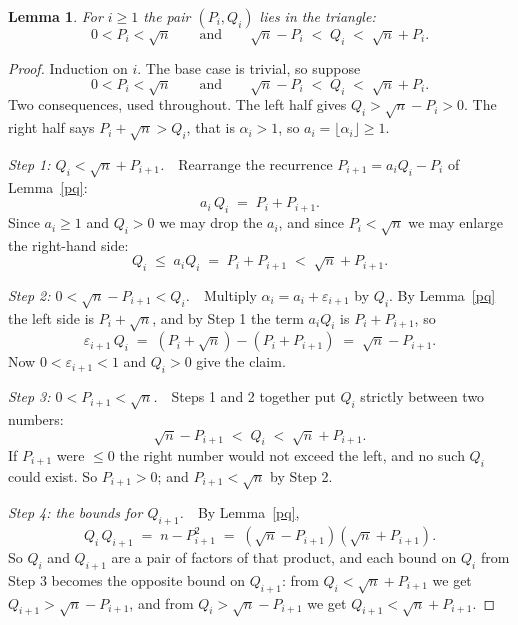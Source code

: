 \documentclass[12pt,a4paper]{article}
\theoremstyle{plain}
\newtheorem{lemma}[theorem]{Lemma}
\theoremstyle{definition}
\begin{document}
\begin{center}
\colorbox{black!8}{%
\begin{minipage}{0.93\textwidth}
\begin{lemma}\label{finite}
For $i \geq 1$ the pair $(P_i, Q_i)$ lies in the triangle:
\[
  0 < P_i < \sqrt n
  \qquad\text{and}\qquad
  \sqrt n - P_i \;<\; Q_i \;<\; \sqrt n + P_i .
\]
\end{lemma}
\end{minipage}}
\end{center}

\begin{proof}
Induction on $i$. The base case is trivial, so suppose
\[
  0 < P_i < \sqrt n
  \qquad\text{and}\qquad
  \sqrt n - P_i \;<\; Q_i \;<\; \sqrt n + P_i .
\]
Two consequences, used throughout. The left half gives
$Q_i > \sqrt n - P_i > 0$. The right half says $P_i + \sqrt n > Q_i$, that is
$\alpha_i > 1$, so $a_i = \lfloor \alpha_i \rfloor \geq 1$.

\smallskip
\noindent\emph{Step 1: $Q_i < \sqrt n + P_{i+1}$.}\ \ Rearrange the recurrence
$P_{i+1} = a_iQ_i - P_i$ of Lemma~\ref{pq}:
\[
  a_i\,Q_i \;=\; P_i + P_{i+1} .
\]
Since $a_i \geq 1$ and $Q_i > 0$ we may drop the $a_i$, and since
$P_i < \sqrt n$ we may enlarge the right-hand side:
\[
  Q_i \;\leq\; a_iQ_i \;=\; P_i + P_{i+1} \;<\; \sqrt n + P_{i+1} .
\]

\smallskip
\noindent\emph{Step 2: $0 < \sqrt n - P_{i+1} < Q_i$.}\ \ Multiply
$\alpha_i = a_i + \varepsilon_{i+1}$ by $Q_i$. By Lemma~\ref{pq} the left side
is $P_i + \sqrt n$, and by Step 1 the term $a_iQ_i$ is $P_i + P_{i+1}$, so
\[
  \varepsilon_{i+1}\,Q_i \;=\; (P_i + \sqrt n) - (P_i + P_{i+1})
    \;=\; \sqrt n - P_{i+1} .
\]
Now $0 < \varepsilon_{i+1} < 1$ and $Q_i > 0$ give the claim.

\smallskip
\noindent\emph{Step 3: $0 < P_{i+1} < \sqrt n$.}\ \ Steps 1 and 2 together put
$Q_i$ strictly between two numbers:
\[
  \sqrt n - P_{i+1} \;<\; Q_i \;<\; \sqrt n + P_{i+1} .
\]
If $P_{i+1}$ were $\leq 0$ the right number would not exceed the left, and no
such $Q_i$ could exist. So $P_{i+1} > 0$; and $P_{i+1} < \sqrt n$ by Step 2.

\smallskip
\noindent\emph{Step 4: the bounds for $Q_{i+1}$.}\ \ By Lemma~\ref{pq},
\[
  Q_i\,Q_{i+1} \;=\; n - P_{i+1}^2
    \;=\; (\sqrt n - P_{i+1})(\sqrt n + P_{i+1}) .
\]
So $Q_i$ and $Q_{i+1}$ are a pair of factors of that product, and each bound on
$Q_i$ from Step 3 becomes the opposite bound on $Q_{i+1}$: from
$Q_i < \sqrt n + P_{i+1}$ we get $Q_{i+1} > \sqrt n - P_{i+1}$, and from
$Q_i > \sqrt n - P_{i+1}$ we get $Q_{i+1} < \sqrt n + P_{i+1}$.
\end{proof}
\end{document}
